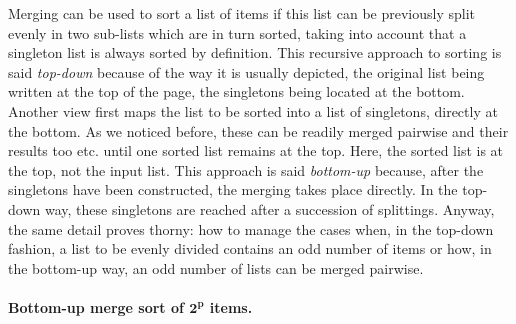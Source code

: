 Merging can be used to sort a list of items if this list can be
previously split evenly in two sub\hyp{}lists which are in turn
sorted, taking into account that a singleton list is always sorted by
definition. This recursive approach to sorting is said
\emph{top\hyp{}down} because of the way it is usually depicted, the
original list being written at the top of the page, the singletons
being located at the bottom. Another view first maps the list to be
sorted into a list of singletons, directly at the bottom. As we
noticed before, these can be readily merged pairwise and their results
too etc. until one sorted list remains at the top. Here, the sorted
list is at the top, not the input list. This approach is said
\emph{bottom\hyp{}up} because, after the singletons have been
constructed, the merging takes place directly. In the top\hyp{}down
way, these singletons are reached after a succession of
splittings. Anyway, the same detail proves thorny: how to manage the
cases when, in the top\hyp{}down fashion, a list to be evenly divided
contains an odd number of items or how, in the bottom\hyp{}up way, an
odd number of lists can be merged pairwise.

\medskip

\paragraph{Bottom\hyp{}up merge sort of \(\boldsymbol{2^p}\) items.} 

